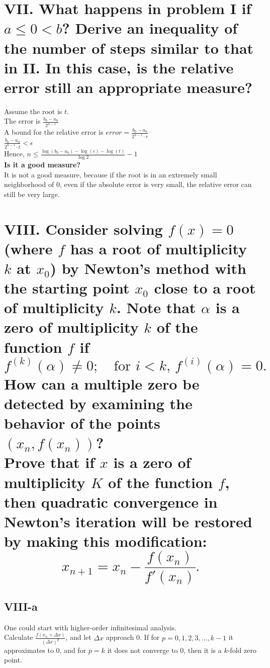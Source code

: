 \documentclass[a4paper]{article}
\begin{document}
\section*{VII. What happens in problem I if \( a \leq 0 < b \)? Derive an inequality of the number of steps similar to that in II. In this case, is the relative error still an appropriate measure?}

Assume the root is \( t \).\\
The error is \( \frac{b_0 - a_0}{2^{n-1}} \)\\
A bound for the relative error is \( error = \frac{b_0 - a_0}{2^{n-1} \cdot r} \)\\
\( \frac{b_0 - a_0}{2^{n-1} \cdot t} < \epsilon \)\\
Hence, \( n \leq \frac{\log(b_0 - a_0) - \log(\epsilon) - \log(t)}{\log 2} - 1 \)\\
\textbf{Is it a good measure?}\\
It is not a good measure, because if the root is in an extremely small neighborhood of 0, even if the absolute error is very small, the relative error can still be very large.

\section*{VIII. Consider solving \( f(x) = 0 \) (where \( f \) has a root of multiplicity \( k \) at \( x_0 \)) by Newton's method with the starting point \( x_0 \) close to a root of multiplicity \( k \). Note that \( \alpha \) is a zero of multiplicity \( k \) of the function \( f \) if
\[
f^{(k)}(\alpha) \neq 0; \quad \text{for } i < k, \, f^{(i)}(\alpha) = 0.
\]
How can a multiple zero be detected by examining the behavior of the points \( (x_n, f(x_n)) \)?
\\
Prove that if \( x \) is a zero of multiplicity \( K \) of the function \( f \), then quadratic convergence in Newton's iteration will be restored by making this modification:
\[
x_{n+1} = x_n - \frac{f(x_n)}{f'(x_n)}.
\]
}

\subsection*{VIII-a}
One could start with higher-order infinitesimal analysis.\\
Calculate \( \frac{f(x_n + \Delta x)}{(\Delta x)^p} \), and let \( \Delta x \) approach 0. If for \( p = 0, 1, 2, 3, \ldots, k-1 \) it approximates to 0, and for \( p = k \) it does not converge to 0, then it is a \( k \)-fold zero point.\\
\end{document}
